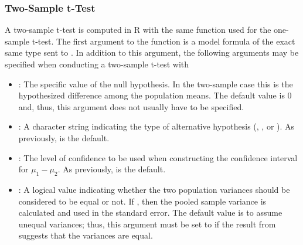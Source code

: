 \documentclass[10pt,openany]{book}\usepackage[]{graphicx}\usepackage[]{color}
\begin{document}
\subsubsection{Two-Sample t-Test}
A two-sample t-test is computed in R with the same  function used for the one-sample t-test.  The first argument to the  function is a model formula of the exact same type sent to .  In addition to this argument, the following arguments may be specified when conducting a two-sample t-test with 
\begin{itemize}
  \item {}: The specific value of the null hypothesis.  In the two-sample case this is the hypothesized difference among the population means.  The default value is $0$ and, thus, this argument does not usually have to be specified.
  \item {}: A character string indicating the type of alternative hypothesis (, , or ).  As previously,  is the default.
  \item {}: The level of confidence to be used when constructing the confidence interval for $\mu_{1}-\mu_{2}$.  As previously,  is the default.
  \item {}: A logical value indicating whether the two population variances should be considered to be equal or not.  If , then the pooled sample variance is calculated and used in the standard error.  The default value is to assume unequal variances; thus, this argument must be set to  if the result from  suggests that the variances are equal.
\end{itemize}

\end{document}
